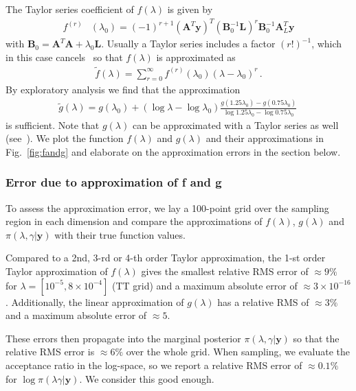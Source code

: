 The Taylor series coefficient of $f(\lambda)$ is given by
\begin{align}
	f^{(r)}& (\lambda_0)= (-1)^{r+1} (\bm{A}^T \bm{y})^T (\bm{B}_0^{-1} \bm{L})^r \bm{B}_0^{-1} \bm{A}_L^T \bm{y} \label{eq:ftay} 
\end{align} 
with $\bm{B}_0 = \bm{A}^T  \bm{A} + \lambda_0 \bm{L}$.
Usually a Taylor series includes a factor $(r!)^{-1}$, which in this case cancels~\cite{fox2016fast} so that $f(\lambda)$ is approximated as 
\begin{align}
		\tilde{f} ( \lambda) = \sum^{\infty}_{r=0} 	f^{(r)}(\lambda_0) (\lambda-\lambda_0)^r  \label{eq:fAprox} \, . 
\end{align}
By exploratory analysis we find that the approximation
\begin{align}
 \tilde{g}(\lambda)=  g(\lambda_{0}) + (\log{\lambda} - \log{\lambda_{0}})  \frac{ g(1.25\lambda_{0}) - g(0.75\lambda_{0}) }{\log{1.25\lambda_{0}} - \log{0.75\lambda_{0}} }  \label{eq:gAprox} \, 
\end{align}
is sufficient.
Note that $g(\lambda)$ can be approximated with a Taylor series as well (see~\cite{fox2016fast}).
We plot the function $f(\lambda)$ and $g(\lambda)$ and their approximations in Fig.~\ref{fig:fandg} and elaborate on the approximation errors in the section below.

\subsubsection{Error due to approximation of f and g}
To assess the approximation error, we lay a 100-point grid over the sampling region in each dimension and compare the approximations of $f(\lambda)$, $g(\lambda)$ and $\pi(\lambda, \gamma | \bm{y})$ with their true function values.

Compared to a 2nd, 3-rd or 4-th order Taylor approximation, the 1-st order Taylor approximation of $f(\lambda)$ gives the smallest relative RMS error of $\approx 9 \%$ for $\lambda = [ 10^{-5}, 8 \times 10^{-4}]$ (TT grid) and a maximum absolute error of $\approx 3 \times 10^{-16}$.
Additionally, the linear approximation of $g(\lambda)$ has a relative RMS of $\approx 3\%$ and a maximum absolute error of $\approx 5$.

These errors then propagate into the marginal posterior $\pi(\lambda , \gamma| \bm{y})$ so that the relative RMS error is $\approx 6 \%$ over the whole grid.
When sampling, we evaluate the acceptance ratio in the log-space, so we report a relative RMS error of $ \approx0.1\%$ for $\log{\pi(\lambda\gamma | \bm{y})}$.
We consider this good enough.




